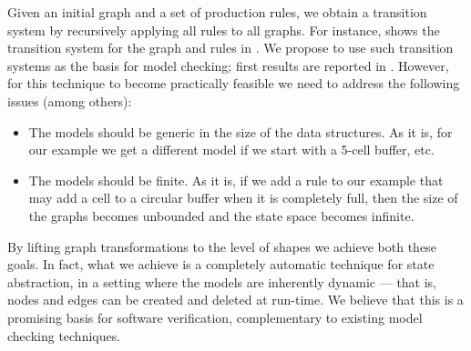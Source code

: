 Given an initial graph and a set of production rules, we obtain a transition
system by recursively applying all rules to all graphs. For instance,
 shows the transition system for the graph and rules in
. We propose to use such transition systems as the basis for
model checking; first results are reported in \cite{RenSchVar04}. However, for
this technique to become practically feasible we need to address the following
issues (among others):
%
\begin{itemize}\noitemsep\smalltopsep
\item The models should be generic in the size of the data structures. As it
  is, for our example we get a different model if we start with a 5-cell
  buffer, etc.
\item The models should be finite. As it is, if we add a rule to our example
  that may add a cell to a circular buffer when it is completely full, then the
  size of the graphs becomes unbounded and the state space becomes infinite.
\end{itemize}
%
By lifting graph transformations to the level of shapes we achieve both these
goals. In fact, what we achieve is a completely automatic technique for state
abstraction, in a setting where the models are inherently dynamic --- that is,
nodes and edges can be created and deleted at run-time. We believe that this is
a promising basis for software verification, complementary to existing model
checking techniques.
%
%
%

